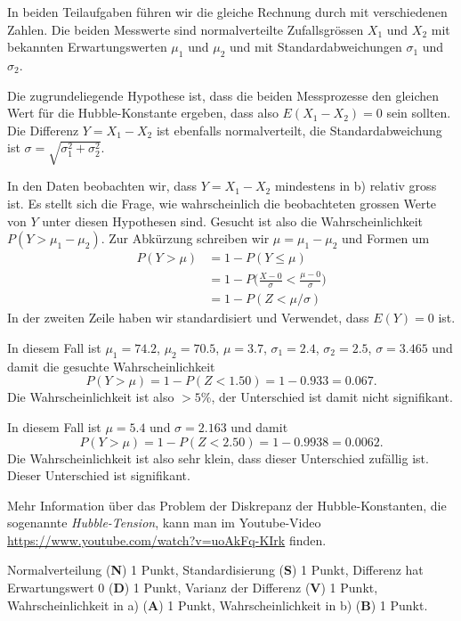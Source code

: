 \begin{loesung}
In beiden Teilaufgaben führen wir die gleiche Rechnung durch mit
verschiedenen Zahlen.
Die beiden Messwerte sind normalverteilte Zufallsgrössen $X_1$ und $X_2$ 
mit bekannten Erwartungswerten $\mu_1$ und $\mu_2$ und
mit Standardabweichungen $\sigma_1$ und $\sigma_2$.

Die zugrundeliegende Hypothese ist, dass die beiden Messprozesse den
gleichen Wert für die Hubble-Konstante ergeben, dass also 
$E(X_1-X_2)=0$ sein sollten.
Die Differenz $Y=X_1-X_2$ ist ebenfalls normalverteilt, die Standardabweichung
ist 
$\sigma=\sqrt{\sigma_1^2+\sigma_2^2}$.

In den Daten beobachten wir, dass $Y=X_1-X_2$ mindestens in b) relativ 
gross ist.
Es stellt sich die Frage, wie wahrscheinlich die beobachteten grossen Werte
von $Y$ unter diesen Hypothesen sind.
Gesucht ist also die Wahrscheinlichkeit $ P(Y > \mu_1-\mu_2).  $
Zur Abkürzung schreiben wir $\mu=\mu_1-\mu_2$ und Formen um
\begin{align*}
P(Y> \mu)
&=
1-P(Y\le \mu)
\\
&=
1-P\biggl(\frac{X-0}{\sigma} < \frac{\mu-0}{\sigma}\biggr)
\\
&=
1-P(Z < \mu/\sigma)
\end{align*}
In der zweiten Zeile haben wir standardisiert und Verwendet, dass
$E(Y)=0$ ist.
\begin{teilaufgaben}
\item
In diesem Fall ist $\mu_1=74.2$, $\mu_2=70.5$, $\mu=3.7$,
$\sigma_1=2.4$, $\sigma_2=2.5$, $\sigma=3.465$ und damit die
gesuchte Wahrscheinlichkeit
\[
P(Y>\mu)
=1-P(Z<1.50) = 1-0.933 = 0.067.
\]
Die Wahrscheinlichkeit ist also $>5\%$, der Unterschied ist damit
nicht signifikant.
\item
In diesem Fall ist $\mu = 5.4$ und $\sigma=2.163$ und damit
\[
P(Y>\mu)
=1-P(Z<2.50) = 1-0.9938 = 0.0062.
\]
Die Wahrscheinlichkeit ist also sehr klein, dass dieser Unterschied
zufällig ist.
Dieser Unterschied ist signifikant.
\qedhere
\end{teilaufgaben}
\end{loesung}

\begin{diskussion}
Mehr Information über das Problem der Diskrepanz der Hubble-Konstanten,
die sogenannte {\em Hubble-Tension}, kann man im
Youtube-Video \url{https://www.youtube.com/watch?v=uoAkFq-KIrk}
finden.
\end{diskussion}

\begin{bewertung}
Normalverteilung ({\bf N}) 1 Punkt,
Standardisierung ({\bf S}) 1 Punkt,
Differenz hat Erwartungswert 0 ({\bf D}) 1 Punkt,
Varianz der Differenz ({\bf V}) 1 Punkt,
Wahrscheinlichkeit in a) ({\bf A}) 1 Punkt,
Wahrscheinlichkeit in b) ({\bf B}) 1 Punkt.
\end{bewertung}
